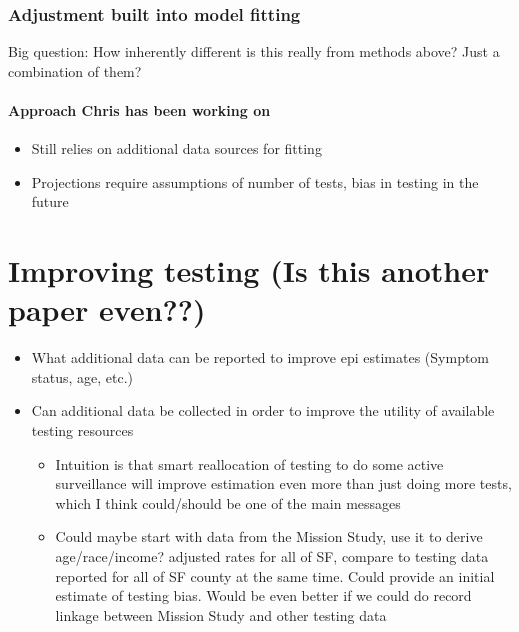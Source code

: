 \documentclass[]{article}
\providecommand{\tightlist}{%
  \setlength{\itemsep}{0pt}\setlength{\parskip}{0pt}}
\let\oldparagraph\paragraph
\renewcommand{\paragraph}[1]{\oldparagraph{#1}\mbox{}}
\begin{document}
\hypertarget{adjustment-built-into-model-fitting}{%
\subsubsection{Adjustment built into model
fitting}\label{adjustment-built-into-model-fitting}}

Big question: How inherently different is this really from methods
above? Just a combination of them?

\hypertarget{approach-chris-has-been-working-on}{%
\paragraph{Approach Chris has been working
on}\label{approach-chris-has-been-working-on}}

\begin{itemize}
\tightlist
\item
  Still relies on additional data sources for fitting\\
\item
  Projections require assumptions of number of tests, bias in testing in
  the future
\end{itemize}

\hypertarget{improving-testing-is-this-another-paper-even}{%
\section{Improving testing (Is this another paper
even??)}\label{improving-testing-is-this-another-paper-even}}

\begin{itemize}
\tightlist
\item
  What additional data can be reported to improve epi estimates (Symptom
  status, age, etc.)\\
\item
  Can additional data be collected in order to improve the utility of
  available testing resources

  \begin{itemize}
  \tightlist
  \item
    Intuition is that smart reallocation of testing to do some active
    surveillance will improve estimation even more than just doing more
    tests, which I think could/should be one of the main messages\\
  \item
    Could maybe start with data from the Mission Study, use it to derive
    age/race/income? adjusted rates for all of SF, compare to testing
    data reported for all of SF county at the same time. Could provide
    an initial estimate of testing bias. Would be even better if we
    could do record linkage between Mission Study and other testing data
  \end{itemize}
\end{itemize}
\end{document}
